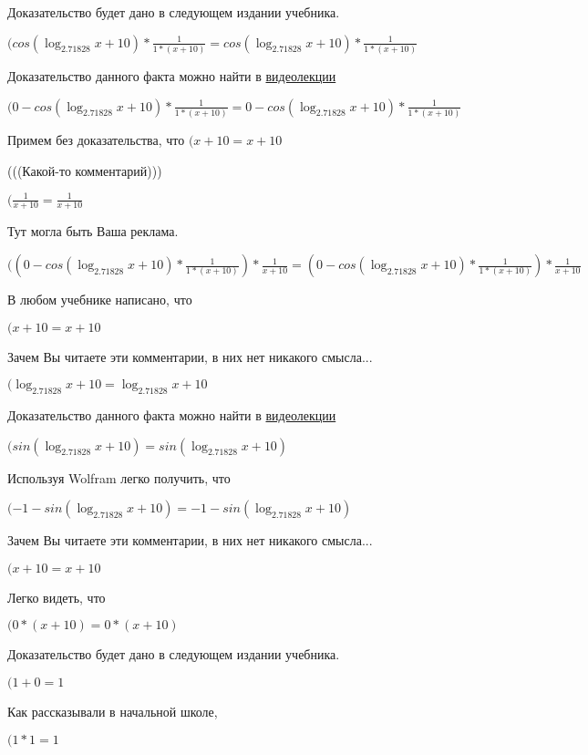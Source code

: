 \documentclass[12pt,a4paper,fleqn]{article}
\theoremstyle{definition}
\begin{document}
Доказательство будет дано в следующем издании учебника.

$(cos(\log_{ 2.71828 }{ x  +  10 }) * \frac{ 1 }{ 1  * ( x  +  10 )}
 = cos(\log_{ 2.71828 }{ x  +  10 }) * \frac{ 1 }{ 1  * ( x  +  10 )}
$

Доказательство данного факта можно найти в \href{https://www.youtube.com/watch?v=dQw4w9WgXcQ}{видеолекции}

$( 0  - cos(\log_{ 2.71828 }{ x  +  10 }) * \frac{ 1 }{ 1  * ( x  +  10 )}
 =  0  - cos(\log_{ 2.71828 }{ x  +  10 }) * \frac{ 1 }{ 1  * ( x  +  10 )}
$

Примем без доказательства, что
$( x  +  10  =  x  +  10 $

(((Какой-то комментарий)))

$(\frac{ 1 }{ x  +  10 }
 = \frac{ 1 }{ x  +  10 }
$

Тут могла быть Ваша реклама.

$(( 0  - cos(\log_{ 2.71828 }{ x  +  10 }) * \frac{ 1 }{ 1  * ( x  +  10 )}
) * \frac{ 1 }{ x  +  10 }
 = ( 0  - cos(\log_{ 2.71828 }{ x  +  10 }) * \frac{ 1 }{ 1  * ( x  +  10 )}
) * \frac{ 1 }{ x  +  10 }
$

В любом учебнике написано, что

$( x  +  10  =  x  +  10 $

Зачем Вы читаете эти комментарии, в них нет никакого смысла...

$(\log_{ 2.71828 }{ x  +  10 } = \log_{ 2.71828 }{ x  +  10 }$

Доказательство данного факта можно найти в \href{https://www.youtube.com/watch?v=dQw4w9WgXcQ}{видеолекции}

$(sin(\log_{ 2.71828 }{ x  +  10 }) = sin(\log_{ 2.71828 }{ x  +  10 })$

Используя Wolfram легко получить, что

$( -1  - sin(\log_{ 2.71828 }{ x  +  10 }) =  -1  - sin(\log_{ 2.71828 }{ x  +  10 })$

Зачем Вы читаете эти комментарии, в них нет никакого смысла...

$( x  +  10  =  x  +  10 $

Легко видеть, что

$( 0  * ( x  +  10 ) =  0  * ( x  +  10 )$

Доказательство будет дано в следующем издании учебника.

$( 1  +  0  =  1 $

Как рассказывали в начальной школе,

$( 1  *  1  =  1 $
\end{document}
